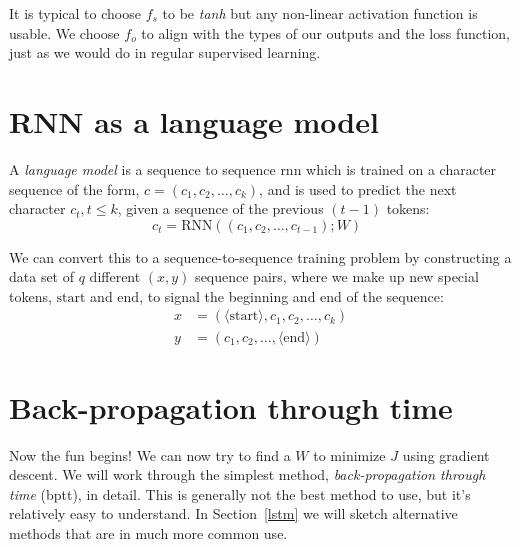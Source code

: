 It is typical to choose $f_s$ to be {\it tanh}  but any non-linear
activation function is usable.  We choose  $f_o$ to align with the
types of our outputs and the loss function,  just as we would do in
regular supervised learning.


\section{RNN as a language model}
\label{sec:language}

A {\em language model} is a sequence to sequence {\sc rnn} which is
trained on a character sequence of the form, $c = (c_1, c_2,
\ldots, c_k)$, and is used to predict the next character $c_t, t \leq k$,
given a sequence of the previous $(t-1)$ tokens: 
\begin{equation}
c_t = \text{RNN}\left((c_1, c_2, \dots, c_{t - 1}) ; W \right)\;\;
\end{equation} 

We can convert this to a sequence-to-sequence training problem by
constructing a data set of $q$ different $(x, y)$ sequence pairs, where we make up
new special tokens, $\text{start}$ and $\text{end}$, to signal the
beginning and end of the sequence:
\begin{align}
x & = (\langle\text{start}\rangle, c_1, c_2, \ldots, c_k)\\
y & = (c_1, c_2, \dots, \langle\text{end}\rangle) 
\end{align}





\section{Back-propagation through time}
\label{sec:bptt}

Now the fun begins!  We can now try to find a $W$ to minimize $J$
using gradient descent.  We will work through the simplest method,
{\em back-propagation through time} ({\sc bptt}), in detail.  This is generally not the best
method to use, but it's relatively easy to understand.  In
Section~\ref{lstm} we will sketch alternative methods that are in much
more common use.

